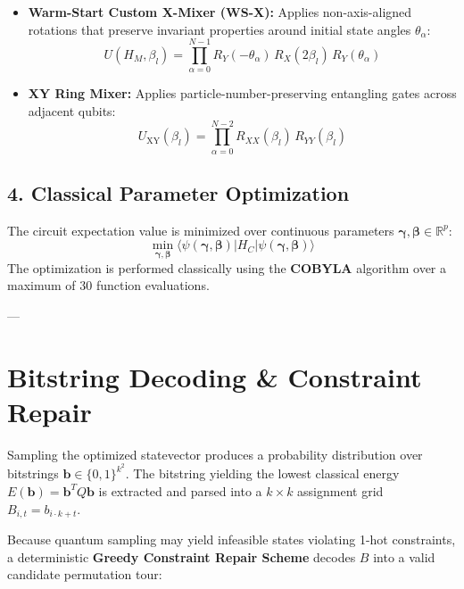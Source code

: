\documentclass[11pt,a4paper]{article}
\begin{document}
\begin{itemize}
    \item \textbf{Warm-Start Custom X-Mixer (WS-X):}
    Applies non-axis-aligned rotations that preserve invariant properties around initial state angles $\theta_\alpha$:
    \begin{equation}
    U(H_M, \beta_l) = \prod_{\alpha=0}^{N-1} R_Y(-\theta_\alpha) \, R_X(2 \beta_l) \, R_Y(\theta_\alpha)
    \end{equation}

    \item \textbf{XY Ring Mixer:}
    Applies particle-number-preserving entangling gates across adjacent qubits:
    \begin{equation}
    U_{\text{XY}}(\beta_l) = \prod_{\alpha=0}^{N-2} R_{XX}(\beta_l) \, R_{YY}(\beta_l)
    \end{equation}
\end{itemize}

\subsection{4. Classical Parameter Optimization}
The circuit expectation value is minimized over continuous parameters $\boldsymbol{\gamma}, \boldsymbol{\beta} \in \mathbb{R}^p$:
\begin{equation}
\min_{\boldsymbol{\gamma}, \boldsymbol{\beta}} \langle \psi(\boldsymbol{\gamma}, \boldsymbol{\beta}) | H_C | \psi(\boldsymbol{\gamma}, \boldsymbol{\beta}) \rangle
\end{equation}
The optimization is performed classically using the \textbf{COBYLA} algorithm over a maximum of 30 function evaluations.

---

\section{Bitstring Decoding \& Constraint Repair}

Sampling the optimized statevector produces a probability distribution over bitstrings $\mathbf{b} \in \{0, 1\}^{k^2}$. The bitstring yielding the lowest classical energy $E(\mathbf{b}) = \mathbf{b}^T Q \mathbf{b}$ is extracted and parsed into a $k \times k$ assignment grid $B_{i,t} = b_{i \cdot k + t}$.

Because quantum sampling may yield infeasible states violating 1-hot constraints, a deterministic \textbf{Greedy Constraint Repair Scheme} decodes $B$ into a valid candidate permutation tour:
\end{document}
